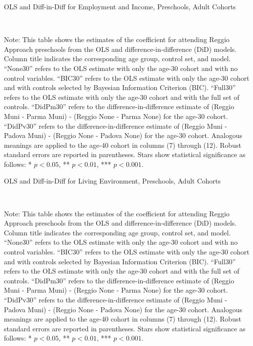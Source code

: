 \documentclass[12pt]{article}
\begin{document}
\begin{landscape}
\begin{table}[H] \caption{OLS and Diff-in-Diff for Employment and Income, Preschools, Adult Cohorts} \label{ols-W-reg}
\scalebox{0.76}{
}
\vspace{1ex} \\
\footnotesize\raggedright{Note: This table shows the estimates of the coefficient for attending Reggio Approach preschools from the OLS and difference-in-difference (DiD) models. Column title indicates the corresponding age group, control set, and model. ``None30'' refers to the OLS estimate with only the age-30 cohort and with no control variables. ``BIC30'' refers to the OLS estimate with only the age-30 cohort and with controls selected by Bayesian Information Criterion (BIC). ``Full30'' refers to the OLS estimate with only the age-30 cohort and with the full set of controls. ``DidPm30'' refers to the difference-in-difference estimate of (Reggio Muni - Parma Muni) - (Reggio None - Parma None) for the age-30 cohort. ``DidPv30'' refers to the difference-in-difference estimate of (Reggio Muni - Padova Muni) - (Reggio None - Padova None) for the age-30 cohort.  Analogous meanings are applied to the age-40 cohort in columns (7) through (12). Robust standard errors are reported in parentheses. Stars show statistical significance as follows: * $p < 0.05$, ** $p < 0.01$, *** $p < 0.001$.}
\end{table}

\begin{table}[H] \caption{OLS and Diff-in-Diff for Living Environment, Preschools, Adult Cohorts} \label{ols-L-reg}
\scalebox{0.80}{
}
\vspace{1ex} \\
\footnotesize\raggedright{Note: This table shows the estimates of the coefficient for attending Reggio Approach preschools from the OLS and difference-in-difference (DiD) models. Column title indicates the corresponding age group, control set, and model. ``None30'' refers to the OLS estimate with only the age-30 cohort and with no control variables. ``BIC30'' refers to the OLS estimate with only the age-30 cohort and with controls selected by Bayesian Information Criterion (BIC). ``Full30'' refers to the OLS estimate with only the age-30 cohort and with the full set of controls. ``DidPm30'' refers to the difference-in-difference estimate of (Reggio Muni - Parma Muni) - (Reggio None - Parma None) for the age-30 cohort. ``DidPv30'' refers to the difference-in-difference estimate of (Reggio Muni - Padova Muni) - (Reggio None - Padova None) for the age-30 cohort.  Analogous meanings are applied to the age-40 cohort in columns (7) through (12). Robust standard errors are reported in parentheses. Stars show statistical significance as follows: * $p < 0.05$, ** $p < 0.01$, *** $p < 0.001$.}
\end{table}


\end{landscape}
\end{document}
